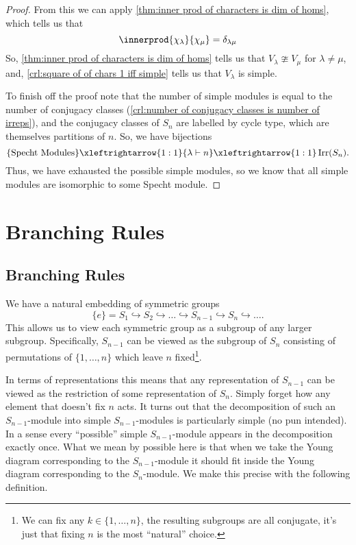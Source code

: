 \documentclass[fleqn]{NotesClass}
\DeclareMathOperator{\Irr}{Irr}
\newcommand{\partition}{\vdash}
\begin{document}
\begin{thm}{}{}
\begin{proof}
            From this we can apply \cref{thm:inner prod of characters is dim of homs}, which tells us that
            \begin{equation}
                \innerprod{\chi_\lambda}{\chi_\mu} = \delta_{\lambda\mu}
            \end{equation}
            So, \cref{thm:inner prod of characters is dim of homs} tells us that \(V_\lambda \ncong V_\mu\) for \(\lambda \ne \mu\), and, \cref{crl:square of of chars 1 iff simple} tells us that \(V_\lambda\) is simple.
            
            To finish off the proof note that the number of simple modules is equal to the number of conjugacy classes (\cref{crl:number of conjugacy classes is number of irreps}), and the conjugacy classes of \(S_n\) are labelled by cycle type, which are themselves partitions of \(n\).
            So, we have bijections
            \begin{equation}
                \{\text{Specht Modules}\} \xleftrightarrow{1:1} \{\lambda \partition n\} \xleftrightarrow{1:1} \Irr(S_n).
            \end{equation}
            Thus, we have exhausted the possible simple modules, so we know that all simple modules are isomorphic to some Specht module.
        \end{proof}
    \end{thm}
    
    \chapter{Branching Rules}
    \section{Branching Rules}
    We have a natural embedding of symmetric groups
    \begin{equation}
        \{e\} = S_1 \hookrightarrow S_2 \hookrightarrow \dotso \hookrightarrow S_{n-1} \hookrightarrow S_n \hookrightarrow \dotso.
    \end{equation}
    This allows us to view each symmetric group as a subgroup of any larger subgroup.
    Specifically, \(S_{n-1}\) can be viewed as the subgroup of \(S_n\) consisting of permutations of \(\{1, \dotsc, n\}\) which leave \(n\) fixed\footnote{We can fix any \(k \in \{1, \dotsc, n\}\), the resulting subgroups are all conjugate, it's just that fixing \(n\) is the most \enquote{natural} choice.}.
    
    In terms of representations this means that any representation of \(S_{n-1}\) can be viewed as the restriction of some representation of \(S_n\).
    Simply forget how any element that doesn't fix \(n\) acts.
    It turns out that the decomposition of such an \(S_{n-1}\)-module into simple \(S_{n-1}\)-modules is particularly simple (no pun intended).
    In a sense every \enquote{possible} simple \(S_{n-1}\)-module appears in the decomposition exactly once.
    What we mean by possible here is that when we take the Young diagram corresponding to the \(S_{n-1}\)-module it should fit inside the Young diagram corresponding to the \(S_n\)-module.
    We make this precise with the following definition.
    
\end{document}
